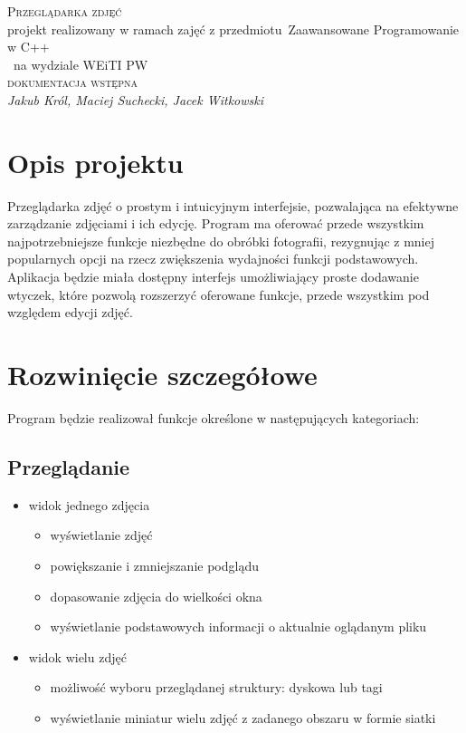 \documentclass[11pt,a4paper]{article}
\begin{document}
\begin{titlepage}
\begin{center}
\vspace*{8cm}
\textsc{\Huge Przeglądarka zdjęć} \\[0.5cm]
{\small projekt realizowany w ramach zajęć z przedmiotu}\
{\small Zaawansowane Programowanie w C++}\\\
{\small na wydziale WEiTI PW}\\[1.5cm]
\textsc{\Large dokumentacja wstępna}\\[2cm]
\emph{Jakub Król, Maciej Suchecki, Jacek Witkowski}

\end{center}
\end{titlepage}

\section{Opis projektu} 
Przeglądarka zdjęć o prostym i intuicyjnym interfejsie, pozwalająca na efektywne zarządzanie zdjęciami i ich edycję. Program ma oferować przede wszystkim najpotrzebniejsze funkcje niezbędne do obróbki fotografii, rezygnując z mniej popularnych opcji na rzecz zwiększenia wydajności funkcji podstawowych. Aplikacja będzie miała dostępny interfejs umożliwiający proste dodawanie wtyczek, które pozwolą rozszerzyć oferowane funkcje, przede wszystkim pod względem edycji zdjęć.

\section{Rozwinięcie szczegółowe}
Program będzie realizował funkcje określone w następujących kategoriach:

\subsection{Przeglądanie}
\begin{itemize}
  \item widok jednego zdjęcia
  \begin{itemize}
    \item wyświetlanie zdjęć 
    \item powiększanie i zmniejszanie podglądu
    \item dopasowanie zdjęcia do wielkości okna
    \item wyświetlanie podstawowych informacji o aktualnie oglądanym pliku
  \end{itemize}
  \item widok wielu zdjęć
  \begin{itemize}
    \item możliwość wyboru przeglądanej struktury: dyskowa lub tagi
    \item wyświetlanie miniatur wielu zdjęć z zadanego obszaru w formie siatki
  \end{itemize}
\end{itemize}
\end{document}
